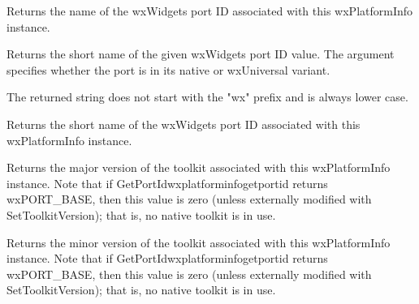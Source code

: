 
Returns the name of the wxWidgets port ID associated with this wxPlatformInfo instance.




\label{wxplatforminfogetportidshortname}


Returns the short name of the given wxWidgets port ID value. The
 argument specifies whether the port is in its native or
wxUniversal variant.

The returned string does not start with the "wx" prefix and is always lower
case.


Returns the short name of the wxWidgets port ID associated with this wxPlatformInfo instance.




\label{wxplatforminfogettoolkitmajorversion}


Returns the major version of the toolkit associated with this wxPlatformInfo instance.
Note that if {GetPortId}{wxplatforminfogetportid} returns wxPORT\_BASE, then this value is zero (unless externally modified with SetToolkitVersion); that is, no native toolkit is in use.




\label{wxplatforminfogettoolkitminorversion}


Returns the minor version of the toolkit associated with this wxPlatformInfo instance.
Note that if {GetPortId}{wxplatforminfogetportid} returns wxPORT\_BASE, then this value is zero (unless externally modified with SetToolkitVersion); that is, no native toolkit is in use.






\label{wxplatforminfoisok}

